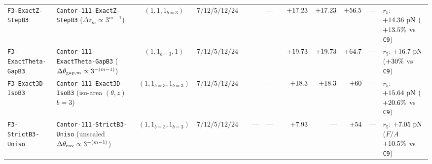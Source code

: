 \begin{table}[!htbp]
{\begin{tabular}{llccrrrrrrrrl}
\texttt{F3-ExactZ-StepB3} & \texttt{Cantor-111-ExactZ-StepB3} ($\Delta z_m \propto 3^{m-1}$) & $(1,1,1_{b=3})$ & $7 / 12 / 5 / 12 / 24$ & \roundfour{\NthreeUnithreedExactzStepbthreeAreaUmtwo} & \roundtwo{\NthreeUnithreedFoneoneoneUnifiedPedgeUm} & --- & \roundone{\NthreeUnithreedFoneoneoneUnifiedGrHarmNm} & $+\roundtwo{\NthreeUnithreedExactzStepbthreeFzPn}$ & $+\roundtwo{\NthreeUnithreedExactzStepbthreeFzPn}$ & $+\roundone{\NthreeUnithreedExactzStepbthreeFa}$ & --- & $r_5$: $+\roundtwo{\NthreeUnithreedExactzStepbthreeRfivenmFzPn}\text{ pN}$ ($+\roundone{\NthreeUnithreedGainExactzStepbthreeVsShufonetwoPct}\%$ vs \texttt{C9}) \\
\texttt{F3-ExactTheta-GapB3} & \texttt{Cantor-111-ExactTheta-GapB3} ($\Delta\theta_{{\rm gap},m} \propto 3^{-(m-1)}$) & $(1,1_{b=3},1)$ & $7 / 12 / 5 / 12 / 24$ & \roundfour{\NthreeUnithreedExactthetaGapbthreeAreaUmtwo} & \roundtwo{\NthreeUnithreedFoneoneoneUnifiedPedgeUm} & \roundtwo{\NthreeUnithreedFoneoneoneUnifiedAswUmtwo} & \roundone{\NthreeUnithreedFoneoneoneUnifiedGrHarmNm} & $+\roundtwo{\NthreeUnithreedExactthetaGapbthreeFzPn}$ & $+\roundtwo{\NthreeUnithreedExactthetaGapbthreeFzPn}$ & $+\roundone{\NthreeUnithreedExactthetaGapbthreeFa}$ & --- & $r_5$: $+\roundtwo{\NthreeUnithreedExactthetaGapbthreeRfivenmFzPn}\text{ pN}$ ($+\roundone{\NthreeUnithreedGainExactthetaGapbthreeVsShufonetwoPct}\%$ vs \texttt{C9}) \\
\texttt{F3-Exact3D-IsoB3} & \texttt{Cantor-111-Exact3D-IsoB3} (iso-area $(\theta,z)$ $b=3$) & $(1,1_{b=3},1_{b=3})$ & $7 / 12 / 5 / 12 / 24$ & \roundfour{\NthreeUnithreedExactthreedIsobthreeAreaUmtwo} & \roundtwo{\NthreeUnithreedFoneoneoneUnifiedPedgeUm} & --- & \roundone{\NthreeUnithreedFoneoneoneUnifiedGrHarmNm} & $+\roundtwo{\NthreeUnithreedExactthreedIsobthreeFzPn}$ & $+\roundtwo{\NthreeUnithreedExactthreedIsobthreeFzPn}$ & $+\roundone{\NthreeUnithreedExactthreedIsobthreeFa}$ & --- & $r_5$: $+\roundtwo{\NthreeUnithreedExactthreedIsobthreeRfivenmFzPn}\text{ pN}$ ($+\roundone{\NthreeUnithreedGainExactthreedIsobthreeVsShufonetwoPct}\%$ vs \texttt{C9}) \\
\texttt{F3-StrictB3-Uniso} & \texttt{Cantor-111-StrictB3-Uniso} (unscaled $\Delta\theta_{\rm env} \propto 3^{-(m-1)}$) & $(1,1_{b=3},1_{b=3})$ & $7 / 12 / 5 / 12 / 24$ & \roundfour{\NthreeUnithreedStrictbthreeUnisoAreaUmtwo} & --- & --- & \roundone{\NthreeUnithreedFoneoneoneUnifiedGrHarmNm} & $+\roundtwo{\NthreeUnithreedStrictbthreeUnisoFzPn}$ & --- & $+\roundone{\NthreeUnithreedStrictbthreeUnisoFa}$ & --- & $r_5$: $+\roundtwo{\NthreeUnithreedStrictbthreeUnisoRfivenmFzPn}\text{ pN}$ ($F/A$ $+\roundone{\fpeval{100*(\NthreeUnithreedStrictbthreeUnisoFa-\NthreeUnithreedCtrlShufonetwoFa)/\NthreeUnithreedCtrlShufonetwoFa}}\%$ vs \texttt{C9}) \\

\end{tabular}}
\end{table}
